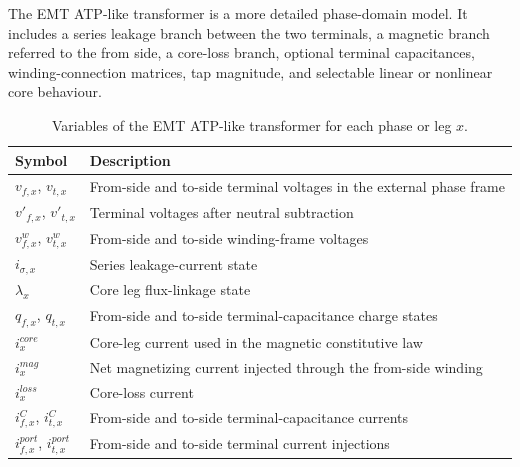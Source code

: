 The EMT ATP-like transformer is a more detailed phase-domain model. It includes a series leakage branch between the two terminals, a magnetic branch referred to the from side, a core-loss branch, optional terminal capacitances, winding-connection matrices, tap magnitude, and selectable linear or nonlinear core behaviour.

\begin{table}[H]
    \centering
    \caption{Variables of the EMT ATP-like transformer for each phase or leg $x$.}
    \begin{tabular}{ll}
        \toprule
        Symbol & Description \\
        \midrule
        $v_{f,x}$, $v_{t,x}$ & From-side and to-side terminal voltages in the external phase frame \\
        $v'_{f,x}$, $v'_{t,x}$ & Terminal voltages after neutral subtraction \\
        $v^w_{f,x}$, $v^w_{t,x}$ & From-side and to-side winding-frame voltages \\
        $i_{\sigma,x}$ & Series leakage-current state \\
        $\lambda_x$ & Core leg flux-linkage state \\
        $q_{f,x}$, $q_{t,x}$ & From-side and to-side terminal-capacitance charge states \\
        $i^{core}_x$ & Core-leg current used in the magnetic constitutive law \\
        $i^{mag}_x$ & Net magnetizing current injected through the from-side winding \\
        $i^{loss}_x$ & Core-loss current \\
        $i^C_{f,x}$, $i^C_{t,x}$ & From-side and to-side terminal-capacitance currents \\
        $i^{port}_{f,x}$, $i^{port}_{t,x}$ & From-side and to-side terminal current injections \\
        \bottomrule
    \end{tabular}
\end{table}

